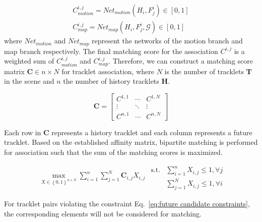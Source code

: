 \documentclass{article} \usepackage{iclr2023_conference,times}
\begin{document}
\begin{equation}\label{eq:affinity scores}
\begin{aligned}
    C^{i,j}_{motion}=Net_{motion}(H_{i},F^{i}_{j}) \in \left[0,1\right] \\
    C^{i,j}_{map}=Net_{map}(H_{i},F^{i}_{j},\mathcal{G})  \in \left[0,1\right] 
\end{aligned}
\end{equation}
where $Net_{motion}$ and $Net_{map}$ represent the networks of the motion branch and map branch respectively. 
The final matching score for the association $C^{i,j}$ is a weighted sum of $C^{i,j}_{motion}$ and $C^{i,j}_{map}$. Therefore, we can construct a matching score matrix $\boldsymbol{C} \in n \times N$ for tracklet association, where $N$ is the number of tracklets $\mathbf{T}$ in the scene and $n$ the number of history tracklets $\mathbf{H}$. 

\begin{equation}
\boldsymbol{C}=\left[\begin{array}{ccc}
C^{1,1} & \cdots & C^{1,N} \\
\vdots & \ddots & \vdots \\
C^{n,1} & \cdots & C^{n,N}
\end{array}\right]
\end{equation}

Each row in $\boldsymbol{C}$ represents a history tracklet and each column represents a future tracklet. Based on the established affinity matrix, bipartite matching is performed for association such that the sum of the matching scores is maximized. 


\begin{subequations}\label{eq:linear_assignment_formulation}
\begin{align}
\max_{X \in \left\{ 0,1 \right\}^{n\times N}} \sum_{i=1}^n \sum_{j=1}^N \boldsymbol{C}_{i, j} X_{i, j}
\end{align} 
\begin{align}
\text{s.t.} & \sum_{i=1}^n X_{i, j} \leq 1, \forall j  \\
    &\sum_{j=1}^N X_{i, j} \leq 1, \forall i
\end{align}
\end{subequations}

For tracklet pairs violating the constraint Eq.~\ref{eq:future candidate constraints}, the corresponding elements will not be considered for matching.
\end{document}
